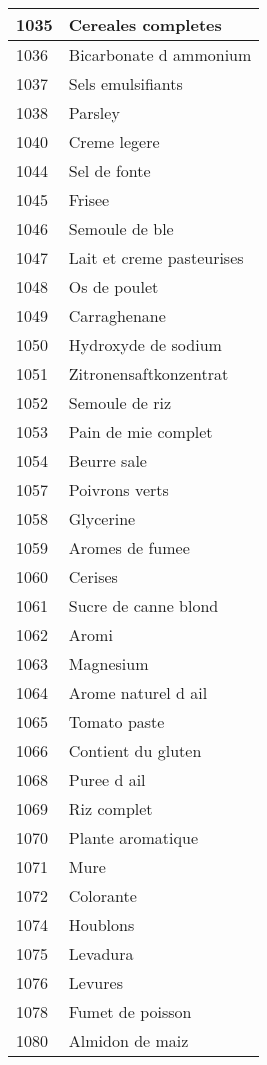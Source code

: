 \begin{longtable}{|l|l|}
1035 & Cereales completes \\ \hline 
1036 & Bicarbonate d ammonium \\ \hline 
1037 & Sels emulsifiants \\ \hline 
1038 & Parsley \\ \hline 
1040 & Creme legere \\ \hline 
1044 & Sel de fonte \\ \hline 
1045 & Frisee \\ \hline 
1046 & Semoule de ble \\ \hline 
1047 & Lait et creme pasteurises \\ \hline 
1048 & Os de poulet \\ \hline 
1049 & Carraghenane \\ \hline 
1050 & Hydroxyde de sodium \\ \hline 
1051 & Zitronensaftkonzentrat \\ \hline 
1052 & Semoule de riz \\ \hline 
1053 & Pain de mie complet \\ \hline 
1054 & Beurre sale \\ \hline 
1057 & Poivrons verts \\ \hline 
1058 & Glycerine \\ \hline 
1059 & Aromes de fumee \\ \hline 
1060 & Cerises \\ \hline 
1061 & Sucre de canne blond \\ \hline 
1062 & Aromi \\ \hline 
1063 & Magnesium \\ \hline 
1064 & Arome naturel d ail \\ \hline 
1065 & Tomato paste \\ \hline 
1066 & Contient du gluten \\ \hline 
1068 & Puree d ail \\ \hline 
1069 & Riz complet \\ \hline 
1070 & Plante aromatique \\ \hline 
1071 & Mure \\ \hline 
1072 & Colorante \\ \hline 
1074 & Houblons \\ \hline 
1075 & Levadura \\ \hline 
1076 & Levures \\ \hline 
1078 & Fumet de poisson \\ \hline 
1080 & Almidon de maiz \\ \hline 

\end{longtable}
